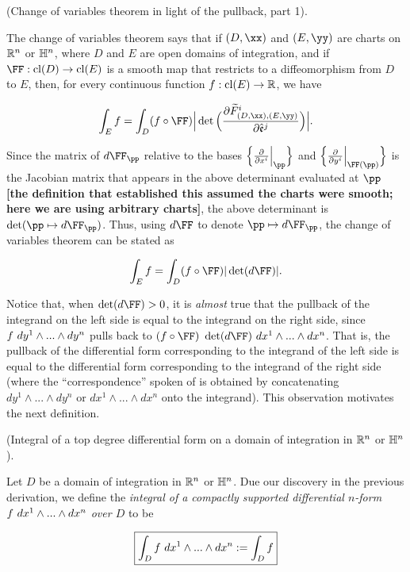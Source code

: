 \begin{deriv}
\label{ch::diff_forms::deriv::change_of_vars_in_light_of_pullback}

     (Change of variables theorem in light of the pullback, part 1).
  
    The change of variables theorem says that if $(D, \xx)$ and $(E, \yy)$ are charts on $\mathbb{R}^n$ or $\mathbb{H}^n$, where $D$ and $E$ are open domains of integration, and if $\FF:\cl(D) \rightarrow \cl(E)$ is a smooth map that restricts to a diffeomorphism from $D$ to $E$, then, for every continuous function $f:\text{cl}(E) \rightarrow \mathbb{R}$, we have
    
    \begin{align*}
        \int_E f = \int_D (f \circ \FF) \Big| \det\Big(\frac{\pd \tF_{(D, \xx), (E, \yy)}^i}{\pd \see^j} \Big) \Big|.
    \end{align*}

    Since the matrix of $d\FF_\pp$ relative to the bases $\Big\{ \frac{\pd}{\pd x^i}\Big|_\pp \Big\}$ and $\Big\{ \frac{\pd}{\pd y^i}\Big|_{\FF(\pp)} \Big\}$ is the Jacobian matrix that appears in the above determinant evaluated at $\pp$ \textbf{[the definition that established this assumed the charts were smooth; here we are using arbitrary charts]}, the above determinant is $\det(\pp \mapsto d\FF_\pp)$. Thus, using $d\FF$ to denote $\pp \mapsto d\FF_\pp$, the change of variables theorem can be stated as

    \begin{align*}
        \int_E f = \int_D (f \circ \FF) |\det(d\FF)|.
    \end{align*}

    Notice that, when $\det(d\FF) > 0$, it is \textit{almost} true that the pullback of the integrand on the left side is equal to the integrand on the right side, since $f \text{ } dy^1 \wedge ... \wedge dy^n$ pulls back to $(f \circ \FF) \spc \det(d\FF) \spc dx^1 \wedge ... \wedge dx^n$. That is, the pullback of the differential form corresponding to the integrand of the left side is equal to the differential form corresponding to the integrand of the right side (where the ``correspondence'' spoken of is obtained by concatenating $dy^1 \wedge ... \wedge dy^n$ or $dx^1 \wedge ... \wedge dx^n$ onto the integrand). This observation motivates the next definition.
\end{deriv}

\begin{defn}
\label{ch::diff_forms::defn::integral_over_domain_of_integration_Rn_Hn}
     (Integral of a top degree differential form on a domain of integration in $\mathbb{R}^n$ or $\mathbb{H}^n$).
    
    Let $D$ be a domain of integration in $\mathbb{R}^n$ or $\mathbb{H}^n$. Due our discovery in the previous derivation, we define the \textit{integral of a compactly supported differential $n$-form $f \text{ } dx^1 \wedge ... \wedge dx^n$ over $D$} to be
    
    \begin{align*}
        \boxed
        {
            \int_D f \text{ } dx^1 \wedge ... \wedge dx^n := \int_D f
        }
    \end{align*}
\end{defn}

